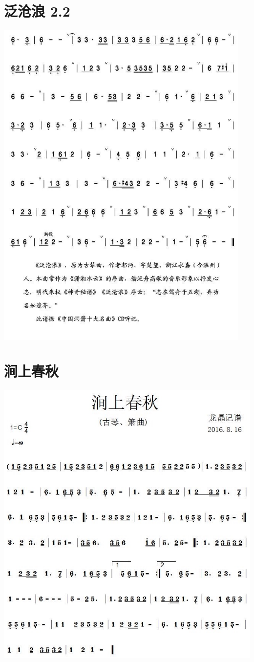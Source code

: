 \documentclass[cn,pad,twocol]{elegantbook}
\begin{document}
\section{泛沧浪 2.2}\includegraphics[width=0.95\textwidth]{dongxiao/20200819/泛沧浪-2.jpeg}
\section{涧上春秋}\includegraphics[width=\textwidth]{dongxiao/20200819/涧上春秋.jpeg}
\end{document}
